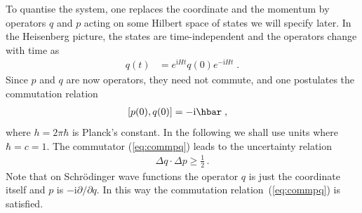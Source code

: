 \documentclass[12pt]{report}
\renewcommand{\i}{\ensuremath{\text{i}}}
\newcommand{\2}{\ensuremath{\sqrt{2}\,}}
\begin{document}
      To quantise the system, one replaces the coordinate and the momentum by operators $q$ and $p$
      acting on some Hilbert space of states we will specify later. In the Heisenberg
      picture, the 
      states are time-independent and the operators change with time as 
      \begin{align}
        q(t)&= e^{\i H t} q(0) e^{-\i H t} \;.
      \end{align}
      Since $p$ and $q$ are now operators, they need not commute, and one postulates the commutation
      relation
      \begin{align}\label{eq:commpq}\index{Canonical commutation relations!for $p$ and $q$}
        \left[p(0),q(0)\right]&= -\i \hbar \;,
      \end{align}
      where $h=2\pi\hbar$ is Planck's constant. In the following we shall       
      use units where $\hbar=c=1$. The commutator (\ref{eq:commpq})
      leads to the uncertainty relation 
      \begin{align}\label{heisen}
        \Delta q \cdot \Delta p \geq \frac{1}{2}\,.
      \end{align}
      Note that on Schr\"odinger wave functions the operator $q$ is just the coordinate itself and
      $p$ is $-\i \partial/\partial q$. In this way the commutation relation~(\ref{eq:commpq}) is 
      satisfied.
\end{document}
